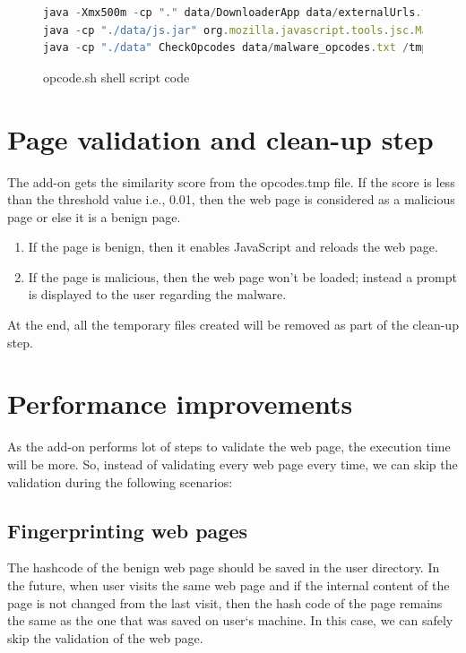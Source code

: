 \begin{figure}[h]
  \centering
\begin{lstlisting}[frame=single,language=JavaScript,mathescape=false]
java -Xmx500m -cp "." data/DownloaderApp data/externalUrls.txt
java -cp "./data/js.jar" org.mozilla.javascript.tools.jsc.Main /tmp/JSStatements.js > /tmp/opcodes.txt
java -cp "./data" CheckOpcodes data/malware_opcodes.txt /tmp/opcodes.txt > $1
\end{lstlisting}
\caption[opcode.sh shell script code]{opcode.sh shell script code}
    \label{fig:shellscriptcode}
\end{figure}

\section{Page validation and clean-up step}

The add-on gets the similarity score from the opcodes.tmp file. If the score is less than the threshold value i.e., 0.01, then the web page is considered as a malicious page or else it is a benign page. 
\begin{enumerate}
\item If the page is benign, then it enables JavaScript and reloads the web page.
\item If the page is malicious, then the web page won't be loaded; instead a prompt is displayed to the user regarding the malware.
\end{enumerate}
At the end, all the temporary files created will be removed as part of the clean-up step.

\section{Performance improvements} 
As the add-on performs lot of steps to validate the web page, the execution time will be more. So, instead of validating every web page every time, we can skip the validation during the following scenarios: 
\subsection{Fingerprinting web pages} \label{fingerprintingwp}
The hashcode of the benign web page should be saved in the user directory. In the future, when user visits the same web page and if the internal content of the page is not changed from the last visit, then the hash code of the page remains the same as the one that was saved on user`s machine. In this case, we can safely skip the validation of the web page. 

